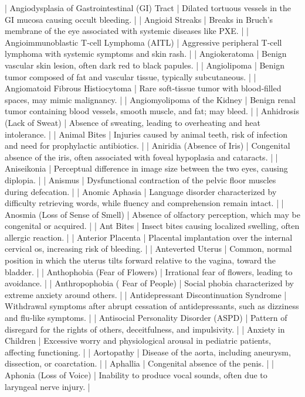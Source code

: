 | Angiodysplasia of Gastrointestinal (GI) Tract | Dilated tortuous vessels in the GI mucosa causing occult bleeding. |
| Angioid Streaks | Breaks in Bruch’s membrane of the eye associated with systemic diseases like PXE. |
| Angioimmunoblastic T‑cell Lymphoma (AITL) | Aggressive peripheral T‑cell lymphoma with systemic symptoms and skin rash. |
| Angiokeratoma | Benign vascular skin lesion, often dark red to black papules. |
| Angiolipoma | Benign tumor composed of fat and vascular tissue, typically subcutaneous. |
| Angiomatoid Fibrous Histiocytoma | Rare soft‑tissue tumor with blood‑filled spaces, may mimic malignancy. |
| Angiomyolipoma of the Kidney | Benign renal tumor containing blood vessels, smooth muscle, and fat; may bleed. |
| Anhidrosis (Lack of Sweat) | Absence of sweating, leading to overheating and heat intolerance. |
| Animal Bites | Injuries caused by animal teeth, risk of infection and need for prophylactic antibiotics. |
| Aniridia (Absence of Iris) | Congenital absence of the iris, often associated with foveal hypoplasia and cataracts. |
| Aniseikonia | Perceptual difference in image size between the two eyes, causing diplopia. |
| Anismus | Dysfunctional contraction of the pelvic floor muscles during defecation. |
| Anomic Aphasia | Language disorder characterized by difficulty retrieving words, while fluency and comprehension remain intact. |
| Anosmia (Loss of Sense of Smell) | Absence of olfactory perception, which may be congenital or acquired. |
| Ant Bites | Insect bites causing localized swelling, often allergic reaction. |
| Anterior Placenta | Placental implantation over the internal cervical os, increasing risk of bleeding. |
| Anteverted Uterus | Common, normal position in which the uterus tilts forward relative to the vagina, toward the bladder. |
| Anthophobia (Fear of Flowers) | Irrational fear of flowers, leading to avoidance. |
| Anthropophobia ( Fear of People) | Social phobia characterized by extreme anxiety around others. |
| Antidepressant Discontinuation Syndrome | Withdrawal symptoms after abrupt cessation of antidepressants, such as dizziness and flu‑like symptoms. |
| Antisocial Personality Disorder (ASPD) | Pattern of disregard for the rights of others, deceitfulness, and impulsivity. |
| Anxiety in Children | Excessive worry and physiological arousal in pediatric patients, affecting functioning. |
| Aortopathy | Disease of the aorta, including aneurysm, dissection, or coarctation. |
| Aphallia | Congenital absence of the penis. |
| Aphonia (Loss of Voice) | Inability to produce vocal sounds, often due to laryngeal nerve injury. |

